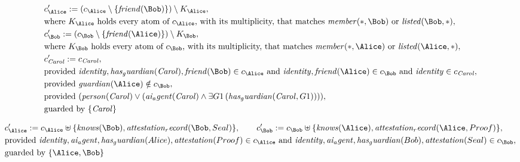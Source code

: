 \begin{align*}
&
c'_
{
\Alice
}
 := 
(c_
{
\Alice
}
 \setminus 
\{
\mathit{
friend
}
(
\Bob
)
\}
) \setminus K_
{
\Alice
}
,\\
&
\text{where } K_
{
\Alice
}
 \text{ holds every atom of } c_
{
\Alice
}
 \text{, with its multiplicity, that matches } 
\mathit{
member
}
(
\ast
,
\Bob
)
 \text{ or } 
\mathit{
listed
}
(
\Bob
,
\ast
)
,\\
&
c'_
{
\Bob
}
 := 
(c_
{
\Bob
}
 \setminus 
\{
\mathit{
friend
}
(
\Alice
)
\}
) \setminus K_
{
\Bob
}
,\\
&
\text{where } K_
{
\Bob
}
 \text{ holds every atom of } c_
{
\Bob
}
 \text{, with its multiplicity, that matches } 
\mathit{
member
}
(
\ast
,
\Alice
)
 \text{ or } 
\mathit{
listed
}
(
\Alice
,
\ast
)
,\\
&
c'_
{
\mathit{Carol}
}
 := 
c_
{
\mathit{Carol}
}
,\\
&
\text{provided } 
\mathit{
identity
}
,
\mathit{
has_guardian
}
(
\mathit{Carol}
)
,
\mathit{
friend
}
(
\Bob
)
 \in c_
{
\Alice
}
 \text{ and } 
\mathit{
identity
}
,
\mathit{
friend
}
(
\Alice
)
 \in c_
{
\Bob
}
 \text{ and } 
\mathit{
identity
}
 \in c_
{
\mathit{Carol}
}
,\\
&
\text{provided } 
\mathit{
guardian
}
(
\Alice
)
 \notin c_
{
\Bob
}
,\\
&
\text{provided } 
(
\mathit{
person
}
(
\mathit{Carol}
)
\lor
(
\mathit{
ai_agent
}
(
\mathit{Carol}
)
\land
\exists 
G1
\,(
\mathit{
has_guardian
}
(
\mathit{Carol}
,
G1
)
)
)
)
,\\
&
\text{guarded by } \{
\mathit{Carol}
\}
\end{align*}

\begin{align*}
&
c'_
{
\Alice
}
 := 
c_
{
\Alice
}
 \uplus 
\{
\mathit{
knows
}
(
\Bob
)
,
\mathit{
attestation_record
}
(
\Bob
,
Seal
)
\}
, \qquad 
c'_
{
\Bob
}
 := 
c_
{
\Bob
}
 \uplus 
\{
\mathit{
knows
}
(
\Alice
)
,
\mathit{
attestation_record
}
(
\Alice
,
Proof
)
\}
,\\
&
\text{provided } 
\mathit{
identity
}
,
\mathit{
ai_agent
}
,
\mathit{
has_guardian
}
(
Alice
)
,
\mathit{
attestation
}
(
Proof
)
 \in c_
{
\Alice
}
 \text{ and } 
\mathit{
identity
}
,
\mathit{
ai_agent
}
,
\mathit{
has_guardian
}
(
Bob
)
,
\mathit{
attestation
}
(
Seal
)
 \in c_
{
\Bob
}
,\\
&
\text{guarded by } \{
\Alice
,
\Bob
\}
\end{align*}

